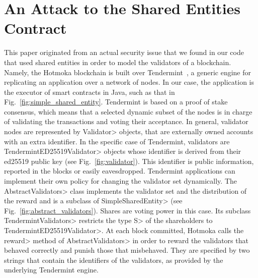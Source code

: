 \section{An Attack to the Shared Entities Contract}\label{sec:attack}

This paper originated from an actual security issue that we found in our code
that used shared entities in order to model the validators of a blockchain.
Namely, the Hotmoka blockchain is built over Tendermint~\cite{Kwon14}, a
generic engine for replicating an application over a network of nodes. In our case,
the application is the executor of smart contracts in Java, such as that in
Fig.~\ref{fig:simple_shared_entity}. Tendermint is based on a proof of stake
consensus, which means that a selected dynamic subset of the nodes is in charge of
validating the transactions and voting their acceptance. In general, validator nodes are
represented by \<Validator> objects, that are externally owned accounts
with an extra identifier. In the specific case of Tendermint,
validators are \<TendermintED25519Validator> objects whose
identifier is derived from their ed25519 public key (see Fig.~\ref{fig:validator}).
This identifier is public information, reported in the blocks or easily eavesdropped.
Tendermint applications can implement their own
policy for changing the validator set dynamically.
The \<AbstractValidators> class implements the validator set
and the distribution of the reward and is a subclass of \<SimpleSharedEntity>
(see Fig.~\ref{fig:abstract_validators}).
Shares are voting power in this case.
Its subclass \<TendermintValidators> restricts the type \<S> of the shareholders
to \<TendermintED25519Validator>.
At each block committed, Hotmoka calls the \<reward> method of \<AbstractValidators>
in order to reward the validators that behaved correctly
and punish those that misbehaved. They are specified by two strings
that contain the identifiers of the validators, as provided by the underlying
Tendermint engine.

